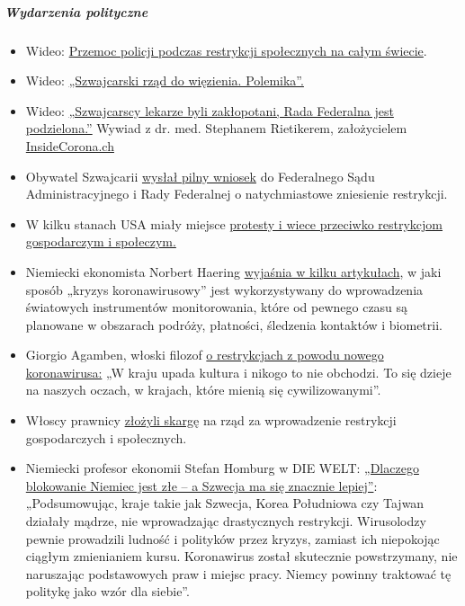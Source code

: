 \hypertarget{wydarzenia-polityczne-2}{%
\subparagraph{\texorpdfstring{\textbf{Wydarzenia
polityczne}}{Wydarzenia polityczne}}\label{wydarzenia-polityczne-2}}

\begin{itemize}
\tightlist
\item
  Wideo:
  \href{https://archive.org/details/what-in-the-world-is-actually-going-on-document-reveals-plans-step-by-step}{Przemoc
  policji podczas restrykcji społecznych na całym świecie}.
\item
  Wideo: \href{https://www.youtube.com/watch?v=SO2JMkKtq40}{„Szwajcarski
  rząd do więzienia. Polemika''.}
\item
  Wideo: \href{https://www.youtube.com/watch?v=eU6IdglI-wc}{„Szwajcarscy
  lekarze byli zakłopotani, Rada Federalna jest podzielona.''} Wywiad z
  dr. med. Stephanem Rietikerem, założycielem
  \href{https://www.insidecorona.ch/}{InsideCorona.ch}
\item
  Obywatel Szwajcarii
  \href{https://faktenb-covid-19-massnahmen.jimdofree.com/}{wysłał pilny
  wniosek} do Federalnego Sądu Administracyjnego i Rady Federalnej o
  natychmiastowe zniesienie restrykcji.
\item
  W kilku stanach USA miały miejsce
  \href{https://news.yahoo.com/protests-draw-thousands-over-state-024328374.html}{protesty
  i wiece przeciwko restrykcjom gospodarczym i społeczym.}
\item
  Niemiecki ekonomista Norbert Haering
  \href{https://norberthaering.de/}{wyjaśnia w kilku artykułach}, w jaki
  sposób „kryzys koronawirusowy'' jest wykorzystywany do wprowadzenia
  światowych instrumentów monitorowania, które od pewnego czasu są
  planowane w obszarach podróży, płatności, śledzenia kontaktów i
  biometrii.
\item
  Giorgio Agamben, włoski filozof
  \href{https://www.nzz.ch/feuilleton/coronavirus-giorgio-agamben-zum-zusammenbruch-der-demokratie-ld.1551896}{o
  restrykcjach z powodu nowego koronawirusa:} „W kraju upada kultura i
  nikogo to nie obchodzi. To się dzieje na naszych oczach, w krajach,
  które mienią się cywilizowanymi''.
\item
  Włoscy prawnicy
  \href{https://www.tvprato.it/2020/04/la-camera-civile-degli-avvocati-pratesi-chiede-lannullamento-del-dpcm-del-10-aprile-e-illegittimo/}{złożyli
  skargę} na rząd za wprowadzenie restrykcji gospodarczych i
  społecznych.
\item
  Niemiecki profesor ekonomii Stefan Homburg w DIE WELT:
  \href{https://www.msn.com/de-de/nachrichten/coronavirus/warum-deutschlands-lockdown-falsch-ist-\%E2\%80\%93-und-schweden-vieles-besser-macht/ar-BB12E6km}{„Dlaczego
  blokowanie Niemiec jest złe -- a Szwecja ma się znacznie lepiej''}:
  „Podsumowując, kraje takie jak Szwecja, Korea Południowa czy Tajwan
  działały mądrze, nie wprowadzając drastycznych restrykcji. Wirusolodzy
  pewnie prowadzili ludność i polityków przez kryzys, zamiast ich
  niepokojąc ciągłym zmienianiem kursu. Koronawirus został skutecznie
  powstrzymany, nie naruszając podstawowych praw i miejsc pracy. Niemcy
  powinny traktować tę politykę jako wzór dla siebie''.
\end{itemize}

